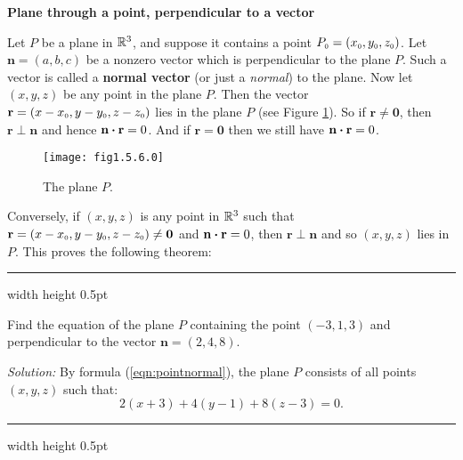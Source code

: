 \par\noindent\textbf{\large{Plane through a point, perpendicular to a vector}}\normalsize\smallskip

Let $P$ be a plane in $\mathbb{R}^{3}$, and suppose it contains a point
$P_{\scriptscriptstyle 0} = (x_{\scriptscriptstyle 0},y_{\scriptscriptstyle 0},z_{\scriptscriptstyle 0})$. Let $\mathbf{n} = (a,b,c)$ be a nonzero vector which is
perpendicular to the plane $P$. Such a vector is called a \textbf{normal vector} (or just a \emph{normal}) to the plane.
 Now let $(x,y,z)$ be any point in the plane $P$. 
Then the vector
$\mathbf{r} = (x - x_{\scriptscriptstyle 0},y - y_{\scriptscriptstyle 0},z - z_{\scriptscriptstyle 0})$ lies in the plane $P$ (see Figure \ref{fig:planenorm}).
So if $\mathbf{r} \ne \mathbf{0}$, then $\mathbf{r} \perp \mathbf{n}$ and hence $\mathbf{n} \bm{\cdot} \mathbf{r} = 0$.
And if $\mathbf{r} = \mathbf{0}$ then we still have $\mathbf{n} \bm{\cdot} \mathbf{r} = 0$.

\begin{figure}[h]
 \begin{center}
  \texttt{[image: fig1.5.6.0]}
 \end{center}
 \caption[]{\quad The plane $P$.}
 \label{fig:planenorm}
\end{figure}

Conversely, if $(x,y,z)$ is any point in $\mathbb{R}^{3}$ such that $\mathbf{r} = (x - x_{\scriptscriptstyle 0},y - y_{\scriptscriptstyle 0},z -
z_{\scriptscriptstyle 0}) \ne \mathbf{0}$ and $\mathbf{n} \bm{\cdot} \mathbf{r} = 0$, then $\mathbf{r} \perp \mathbf{n}$ and
so $(x,y,z)$ lies in $P$. This proves the following theorem:

\hrule width \textwidth height 0.5pt
\begin{exmp}\label{exmp:pointnormal}
 Find the equation of the plane $P$ containing the point $(-3,1,3)$ and perpendicular to the vector $\mathbf{n} =
 (2,4,8)$.\smallskip
 \par\noindent\emph{Solution:} By formula (\ref{eqn:pointnormal}), the plane $P$ consists of all points $(x,y,z)$ such
 that:
 \begin{displaymath}
  2(x + 3) + 4(y - 1) + 8(z - 3) = 0.
 \end{displaymath}
\end{exmp}
\hrule width \textwidth height 0.5pt
\smallskip

